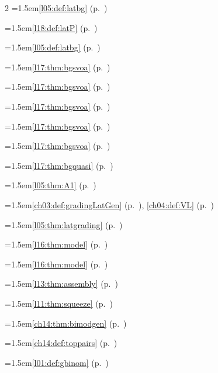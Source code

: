 \begin{multicols}{2}
\hangindent=1.5em\quad \ref{l05:def:latbg} (p.~\pageref{l05:def:latbg})\par
\hangindent=1.5em\quad \ref{l18:def:latP} (p.~\pageref{l18:def:latP})\par
\hangindent=1.5em\quad \ref{l05:def:latbg} (p.~\pageref{l05:def:latbg})\par
\hangindent=1.5em\quad \ref{l17:thm:bgsvoa} (p.~\pageref{l17:thm:bgsvoa})\par
\hangindent=1.5em\quad \ref{l17:thm:bgsvoa} (p.~\pageref{l17:thm:bgsvoa})\par
\hangindent=1.5em\quad \ref{l17:thm:bgsvoa} (p.~\pageref{l17:thm:bgsvoa})\par
\hangindent=1.5em\quad \ref{l17:thm:bgsvoa} (p.~\pageref{l17:thm:bgsvoa})\par
\hangindent=1.5em\quad \ref{l17:thm:bgsvoa} (p.~\pageref{l17:thm:bgsvoa})\par
\hangindent=1.5em\quad \ref{l17:thm:bgquasi} (p.~\pageref{l17:thm:bgquasi})\par
\hangindent=1.5em\quad \ref{l05:thm:A1} (p.~\pageref{l05:thm:A1})\par
\hangindent=1.5em\quad \ref{ch03:def:gradingLatGen} (p.~\pageref{ch03:def:gradingLatGen}), \ref{ch04:def:VL} (p.~\pageref{ch04:def:VL})\par
\hangindent=1.5em\quad \ref{l05:thm:latgrading} (p.~\pageref{l05:thm:latgrading})\par
\hangindent=1.5em\quad \ref{l16:thm:model} (p.~\pageref{l16:thm:model})\par
\hangindent=1.5em\quad \ref{l16:thm:model} (p.~\pageref{l16:thm:model})\par
\hangindent=1.5em\quad \ref{l13:thm:assembly} (p.~\pageref{l13:thm:assembly})\par
\hangindent=1.5em\quad \ref{l11:thm:squeeze} (p.~\pageref{l11:thm:squeeze})\par
\hangindent=1.5em\quad \ref{ch14:thm:bimodgen} (p.~\pageref{ch14:thm:bimodgen})\par
\hangindent=1.5em\quad \ref{ch14:def:toppairs} (p.~\pageref{ch14:def:toppairs})\par
\hangindent=1.5em\quad \ref{l01:def:gbinom} (p.~\pageref{l01:def:gbinom})\par

\end{multicols}
